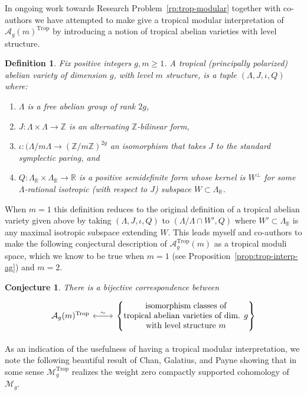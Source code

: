 \documentclass[11pt,reqno]{amsart}
\newtheorem{conj}[lemma]{Conjecture}
\newtheorem{defn}[lemma]{Definition}
\theoremstyle{remark}
\newcommand{\RR}{\mathbb{R}}
\newcommand{\ZZ}{\mathbb{Z}}
\newcommand{\cA}{\mathcal{A}}
\newcommand{\cM}{\mathcal{M}}
\DeclareMathOperator{\Trop}{Trop}
\DeclareMathOperator{\trop}{Trop}
\begin{document}
In ongoing work towards Research Problem~\ref{rp:trop-modular} together with co-authors we have attempted to make give a tropical modular interpretation of $\cA_{g}(m)^{\trop}$ by introducing a notion of tropical abelian varieties with level structure. 

\begin{defn}
Fix positive integers $g,m\geq1$. A {\em tropical (principally polarized) abelian variety of dimension $g$, with level $m$} structure, is a tuple $(\Lambda,J,\iota,Q)$ where:
\begin{enumerate}
\item $\Lambda$ is a free abelian group of rank $2g$,
\item $J:\Lambda\times \Lambda\to \ZZ$ is an alternating $\ZZ$-bilinear form,
\item $\iota:(\Lambda/m\Lambda\to (\ZZ/m\ZZ)^{2g}$ an isomorphism that takes $J$ to the standard symplectic paring, and
\item $Q:\Lambda_{\RR}\times\Lambda_{\RR}\to \RR$ is a positive semidefinite form whose kernel is $W^{\perp}$ for some $\Lambda$-rational isotropic (with respect to $J$) subspace $W\subset \Lambda_{\RR}$. 
\end{enumerate}
\end{defn}

When $m=1$ this definition reduces to the original definition of a tropical abelian variety given above by taking $(\Lambda, J,\iota,Q)$ to $(\Lambda/\Lambda\cap W', Q)$ where $W'\subset \Lambda_{\RR}$ is any maximal isotropic subspace extending $W$. This leads myself and co-authors to make the following conjectural description of $\mathcal{A}_{g}^{\Trop}(m)$ as a tropical moduli space, which we know to be true when $m=1$ (see Proposition~\ref{prop:trop-interp-ag}) and $m=2$. 

\begin{conj}
There is a bijective correspondence between
\[
\begin{tikzcd}
\mathcal{A}_{g}(m)^{\Trop} \arrow[r, leftrightarrow, "\sim"] & \left\{ \begin{matrix} \text{isomorphism classes of} \\
\text{tropical abelian varieties of dim. $g$}\\
\text{with level structure $m$}
\end{matrix}\right\}
\end{tikzcd}
\]
\end{conj}


As an indication of the usefulness of having a tropical modular interpretation, we note the following beautiful result of Chan, Galatius, and Payne showing that in some sense $\cM_{g}^{\trop}$ realizes the weight zero compactly supported cohomology of $\cM_{g}$.
\end{document}
